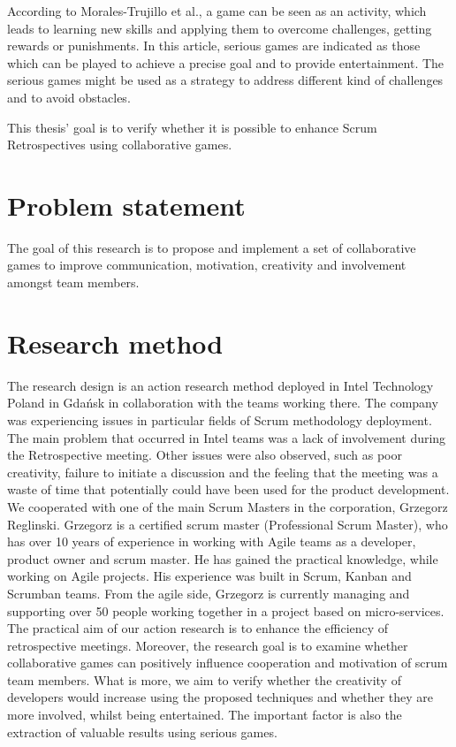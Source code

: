 According to Morales-Trujillo et al.\cite{MiguelGames}, a game can be seen as an activity, which leads to learning new skills and applying them to overcome challenges, getting rewards or punishments. In this article, serious games are indicated as those which can be played to achieve a precise goal and to provide entertainment. The serious games might be used as a strategy to address different kind of challenges and to avoid obstacles\cite{MiguelGames}.

This thesis' goal is to verify whether it is possible to enhance Scrum Retrospectives using collaborative games.

\section{Problem statement}

The goal of this research is to propose and implement a set of collaborative games to improve communication, motivation, creativity and involvement amongst team members.

\section{Research method}

The research design is an action research method deployed in Intel Technology Poland in Gdańsk in collaboration with the teams working there. The company was experiencing issues in particular fields of Scrum methodology deployment. The main problem that occurred in Intel teams was a lack of involvement during the Retrospective meeting. Other issues were also observed, such as poor creativity, failure to initiate a discussion and the feeling that the meeting was a waste of time that potentially could have been used for the product development. We cooperated with one of the main Scrum Masters in the corporation, Grzegorz Reglinski. Grzegorz is a certified scrum master (Professional Scrum Master), who has over 10 years of experience in working with Agile teams as a developer, product owner and scrum master. He has gained the practical knowledge, while working on Agile projects. His experience was built in Scrum, Kanban and Scrumban teams. From the agile side, Grzegorz is currently managing and supporting over 50 people working together in a project based on micro-services. The practical aim of our action research is to enhance the efficiency of retrospective meetings. Moreover, the research goal is to examine whether collaborative games can positively influence cooperation and motivation of scrum team members. What is more, we aim to verify whether the creativity of developers would increase using the proposed techniques and whether they are more involved, whilst being entertained. The important factor is also the extraction of valuable results using serious games.

